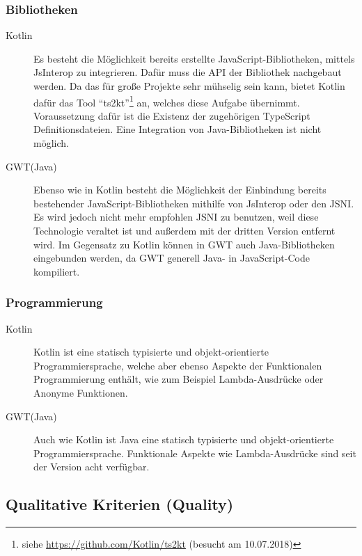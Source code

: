 \subsubsection{Bibliotheken}
\begin{description}
	\item[Kotlin] Es besteht die Möglichkeit bereits erstellte JavaScript-Bibliotheken, mittels \gls{JsInterop} zu integrieren. Dafür muss die \gls{API} der Bibliothek nachgebaut werden. Da das für große Projekte sehr mühselig sein kann, bietet Kotlin dafür das Tool \enquote{ts2kt}\footnote{siehe \url{https://github.com/Kotlin/ts2kt} (besucht am 10.07.2018)} an, welches diese Aufgabe übernimmt. Voraussetzung dafür ist die Existenz der zugehörigen TypeScript Definitionsdateien. Eine Integration von Java-Bibliotheken ist nicht möglich. \cite{kotlinJsInteop, kotlinJsJavaToJs}
	\item[GWT(Java)] Ebenso wie in Kotlin besteht die Möglichkeit der Einbindung bereits bestehender JavaScript-Bibliotheken mithilfe von \gls{JsInterop} oder den \gls{JSNI}. Es wird jedoch nicht mehr empfohlen  \gls{JSNI} zu benutzen, weil diese Technologie veraltet ist und außerdem mit der dritten Version entfernt wird. Im Gegensatz zu Kotlin können in \gls{GWT} auch Java-Bibliotheken eingebunden werden, da \gls{GWT} generell Java- in JavaScript-Code kompiliert. \cite{gwtJsInterop, gwtJSNI}
\end{description}

\subsubsection{Programmierung}
\begin{description}
	\item[Kotlin] Kotlin ist eine statisch typisierte und objekt-orientierte Programmiersprache, welche aber ebenso Aspekte der Funktionalen Programmierung enthält, wie zum Beispiel Lambda-Ausdrücke oder Anonyme Funktionen. \cite{kotlinInfo}
	\item[GWT(Java)] Auch wie Kotlin ist Java eine statisch typisierte und objekt-orientierte Programmiersprache. Funktionale Aspekte wie Lambda-Ausdrücke sind seit der Version acht verfügbar. \cite{java8Specification}
\end{description}

\subsection{Qualitative Kriterien (Quality)}
